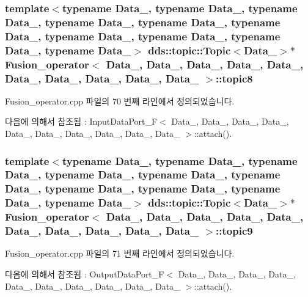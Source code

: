 \subsubsection[{\texorpdfstring{topic8}{topic8}}]{\setlength{\rightskip}{0pt plus 5cm}template$<$typename Data\+\_, typename Data\+\_, typename Data\+\_, typename Data\+\_, typename Data\+\_, typename Data\+\_, typename Data\+\_, typename Data\+\_, typename Data\+\_, typename Data\+\_$>$ dds\+::topic\+::\+Topic$<$Data\+\_$>$$\ast$ {\bf Fusion\+\_\+operator}$<$ Data\+\_, Data\+\_, Data\+\_, Data\+\_, Data\+\_, Data\+\_, Data\+\_, Data\+\_, Data\+\_, Data\+\_ $>$\+::topic8}\hypertarget{classFusion__operator_ab050a3199eb223c53a60087961d0e0cc}{}\label{classFusion__operator_ab050a3199eb223c53a60087961d0e0cc}


Fusion\+\_\+operator.\+cpp 파일의 70 번째 라인에서 정의되었습니다.



다음에 의해서 참조됨 \+:  Input\+Data\+Port\+\_\+\+F$<$ Data\+\_, Data\+\_, Data\+\_, Data\+\_, Data\+\_, Data\+\_, Data\+\_, Data\+\_, Data\+\_, Data\+\_ $>$\+::attach().

\subsubsection[{\texorpdfstring{topic9}{topic9}}]{\setlength{\rightskip}{0pt plus 5cm}template$<$typename Data\+\_, typename Data\+\_, typename Data\+\_, typename Data\+\_, typename Data\+\_, typename Data\+\_, typename Data\+\_, typename Data\+\_, typename Data\+\_, typename Data\+\_$>$ dds\+::topic\+::\+Topic$<$Data\+\_$>$$\ast$ {\bf Fusion\+\_\+operator}$<$ Data\+\_, Data\+\_, Data\+\_, Data\+\_, Data\+\_, Data\+\_, Data\+\_, Data\+\_, Data\+\_, Data\+\_ $>$\+::topic9}\hypertarget{classFusion__operator_afb0a94863c813bbc7fc2a52838301937}{}\label{classFusion__operator_afb0a94863c813bbc7fc2a52838301937}


Fusion\+\_\+operator.\+cpp 파일의 71 번째 라인에서 정의되었습니다.



다음에 의해서 참조됨 \+:  Output\+Data\+Port\+\_\+\+F$<$ Data\+\_, Data\+\_, Data\+\_, Data\+\_, Data\+\_, Data\+\_, Data\+\_, Data\+\_, Data\+\_, Data\+\_ $>$\+::attach().

